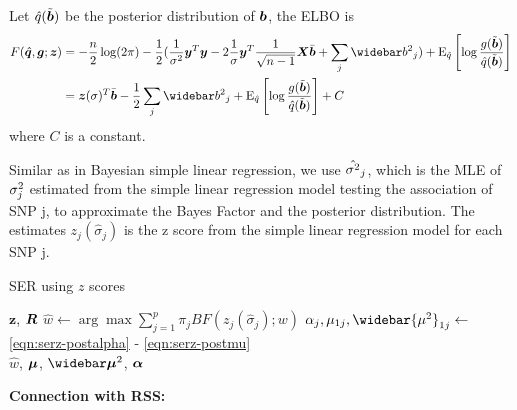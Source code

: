 Let $\hat{q}(\tilde{\bm b})$ be the posterior distribution of $\bm b$, the ELBO is
\begin{align}
    F(\hat{\q},\g;\bm{z}) &= -\frac{n}{2} \log(2\pi) - \frac{1}{2}(\frac{1}{\rv}\vy^T\vy - 2 \frac{1}{\sigma}\vy^T\frac{1}{\sqrt{n-1}}\mx \bar{\vb} + \sum_j \bbb_{j}) + \E_{\hat{q}}\left[\log\frac{g(\tilde{\vb})}{\hat{q}(\tilde{\vb})} \right] \\
    &= \bm{z}(\sigma)^{T} \bar{\vb} - \frac{1}{2} \sum_j \bbb_{j} + \E_{\hat{q}}\left[\log\frac{g(\tilde{\vb})}{\hat{q}(\tilde{\vb})}\right] + C\label{eqn:SERzelbo}
\end{align}
where $C$ is a constant.

Similar as in Bayesian simple linear regression, we use $\hat{\sigma^2}_j$, which is the MLE of $\sigma^2_j$ estimated from the simple linear regression model testing the association of SNP j, to approximate the Bayes Factor and the posterior distribution. The estimates $z_j(\hat{\sigma}_j)$ is the z score from the simple linear regression model for each SNP j.

\begin{algorithm}[H] 
\caption{SER using $z$ scores} \label{alg:SERzalg}
\begin{algorithmic}[1]
\Require $\bm{z}$, $\bm R$
\State $\hat{w} \gets \arg \max \sum_{j=1}^{p} \pi_j BF(z_j(\hat{\sigma}_j); w)$  
\State $\alpha_j, \mu_{1j}, \widebar{\mu^2}_{1j} \gets $ \eqref{eqn:serz-postalpha} - \eqref{eqn:serz-postmu}  \\
\Return $\hat{w}$, $\bm \mu$, $\emusq$, $\bm \alpha$
\end{algorithmic}
\end{algorithm}

\textbf{Connection with RSS:}

